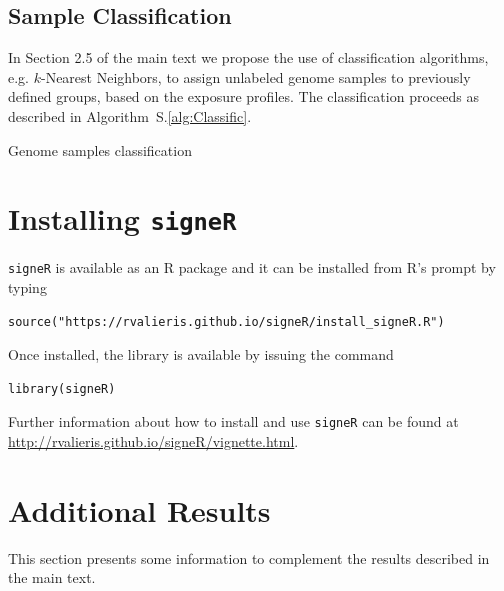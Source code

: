\documentclass[11pt]{amsart}
\makeatletter
\def\BState{\State\hskip-\ALG@thistlm}
\theoremstyle{definition}
\makeatother
\begin{document}
\subsection{Sample Classification}
In Section 2.5 of the main text we propose the use of classification
algorithms, e.g. $k$-Nearest Neighbors, to assign unlabeled genome
samples to previously defined groups, based on the exposure profiles.
The classification proceeds as described in
Algorithm~S.\ref{alg:Classific}.

\begin{algorithm}
\caption{Genome samples classification}\label{alg:Classific}
\end{algorithm}


\section{Installing \texttt{signeR}}
\texttt{signeR} is available as an R package and it can be installed
from R's prompt by typing
\begin{lstlisting}[]
   source("https://rvalieris.github.io/signeR/install_signeR.R")
\end{lstlisting}
Once installed, the library is available by issuing the command
\begin{lstlisting}[]
   library(signeR)
\end{lstlisting}
Further information about how to install and use \texttt{signeR} can
be found at \\ 
\indent\indent\url{http://rvalieris.github.io/signeR/vignette.html}.

\section{Additional Results}
This section presents some information to complement the results
described in the main text. 
\end{document}
